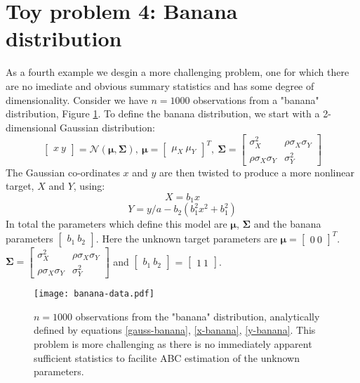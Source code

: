 \section{Toy problem 4: Banana distribution}

As a fourth example we desgin a more challenging problem, one for which there are no imediate and obvious summary statistics and has some degree of dimensionality. Consider we have $n = 1000$ observations from a "banana" distribution, Figure \ref{banana-data}. To define the banana distribution, we start with a 2-dimensional Gaussian distribution:
\begin{equation}
\begin{bmatrix}
x\ y
\end{bmatrix}=\mathcal{N}(\bm{\mu},\bm{\Sigma}),\ \bm{\mu} = \begin{bmatrix}
\mu_X\ \mu_Y
\end{bmatrix}^T,\ \bm{\Sigma} = \begin{bmatrix}
\sigma^2_X & \rho\sigma_X\sigma_Y\\
\rho\sigma_X\sigma_Y & \sigma^2_Y
\end{bmatrix} 
\label{gauss-banana}
\end{equation}
The Gaussian co-ordinates $x$ and $y$ are then twisted to produce a more nonlinear target, $X$ and $Y$, using:
\begin{equation}
X = b_1x
\label{x-banana}
\end{equation}
\begin{equation}
Y = y/a-b_2(b_1^2x^2+b_1^2)
\label{y-banana}
\end{equation}
In total the parameters which define this model are $\bm{\mu}$, $\bm{\Sigma}$ and the banana parameters $\begin{bmatrix}
b_1\ b_2
\end{bmatrix}$. Here the unknown target parameters are $\bm{\mu} = \begin{bmatrix}
0\ 0
\end{bmatrix}^T$.
$\bm{\Sigma} = \begin{bmatrix}
\sigma^2_X & \rho\sigma_X\sigma_Y\\
\rho\sigma_X\sigma_Y & \sigma^2_Y
\end{bmatrix}$ and $\begin{bmatrix}
b_1\ b_2
\end{bmatrix}$ = $\begin{bmatrix}
1\ 1
\end{bmatrix}$. 

\begin{figure}[H]
\centering
\texttt{[image: banana-data.pdf]}
\caption{$n = 1000$ observations from the "banana" distribution, analytically defined by equations \ref{gauss-banana}, \ref{x-banana}, \ref{y-banana}. 
This problem is more challenging as there is no immediately apparent sufficient statistics to facilite ABC estimation of the unknown parameters.}
\label{banana-data}
\end{figure}

